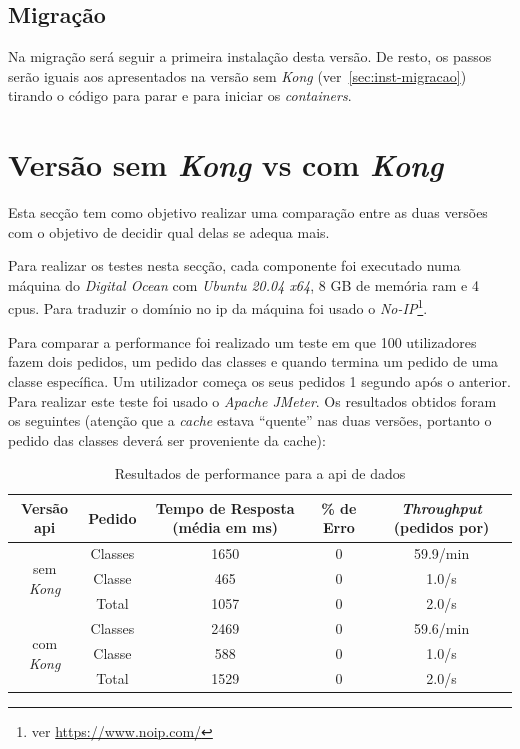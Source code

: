 \subsection{Migração}

Na migração será seguir a primeira instalação desta versão. De resto, os passos serão iguais aos apresentados na versão sem \textit{Kong} (ver~\ref{sec:inst-migracao}) tirando o código para parar e para iniciar os \textit{containers}.

\section{Versão sem \textit{Kong} vs com \textit{Kong}}

Esta secção tem como objetivo realizar uma comparação entre as duas versões com o objetivo de decidir qual delas se adequa mais.

Para realizar os testes nesta secção, cada componente foi executado numa máquina do \textit{Digital Ocean} com \textit{Ubuntu 20.04 x64}, 8 GB de memória \acrshort{ram} e 4 \acrshort{cpu}s. Para traduzir o domínio no \acrshort{ip} da máquina foi usado o \textit{No-IP}\footnote{ver \url{https://www.noip.com/}}.

Para comparar a performance foi realizado um teste em que 100 utilizadores fazem dois pedidos, um pedido das classes e quando termina um pedido de uma classe específica. Um utilizador começa os seus pedidos 1 segundo após o anterior. Para realizar este teste foi usado o \textit{Apache JMeter}. Os resultados obtidos foram os seguintes (atenção que a \textit{cache} estava ``quente'' nas duas versões, portanto o pedido das classes deverá ser proveniente da cache):

\begin{table}[H]
    \footnotesize
    \centering
    \begin{tabular}{| c | c | c | c | c | }
        \hline
        Versão \acrshort{api} & Pedido & Tempo de Resposta (média em ms) & \% de Erro & \textit{Throughput} (pedidos por) \\ \hline
        \multirow{3}{*}{sem \textit{Kong}} & Classes & 1650 & 0 & 59.9/min \\ \cline{2-5}
        & Classe & 465 & 0 & 1.0/s \\ \cline{2-5}
        & Total & 1057 & 0 & 2.0/s \\ \hline
        \multirow{3}{*}{com \textit{Kong}} & Classes & 2469 & 0 & 59.6/min \\ \cline{2-5}
        & Classe & 588 & 0 & 1.0/s \\ \cline{2-5}
        & Total & 1529 & 0 & 2.0/s \\ \hline
    \end{tabular}
    \caption{Resultados de performance para a \acrshort{api} de dados}
\end{table}


